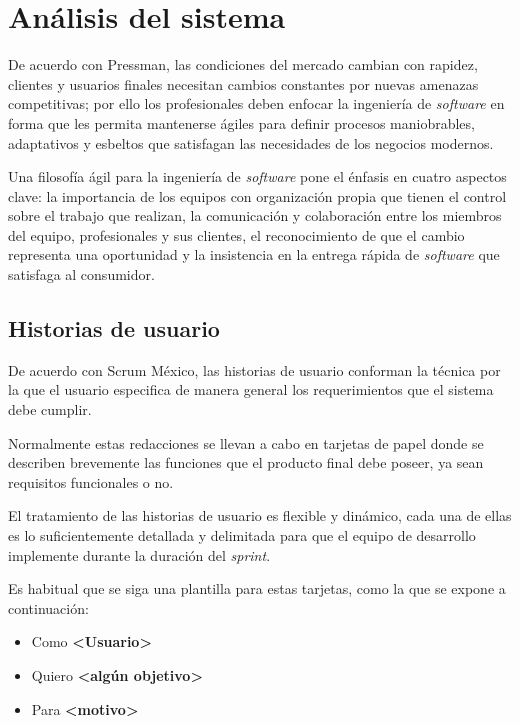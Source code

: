 \section{Análisis del sistema}
De acuerdo con Pressman\cite{pressman_software_2005}, las condiciones del mercado cambian con rapidez, clientes y usuarios finales necesitan cambios constantes por nuevas amenazas competitivas; por ello los profesionales deben enfocar la ingeniería de \textit{software} en forma que les permita mantenerse ágiles para definir procesos maniobrables, adaptativos y esbeltos que satisfagan las necesidades de los negocios modernos.


Una filosofía ágil para la ingeniería de \textit{software} pone el énfasis en cuatro aspectos clave: la importancia de los equipos con organización propia que tienen el control sobre el trabajo que realizan, la comunicación y colaboración entre los miembros del equipo, profesionales y sus clientes, el reconocimiento de que el cambio representa una oportunidad y la insistencia en la entrega rápida de \textit{software} que satisfaga al consumidor.


\subsection{Historias de usuario}\label{sec:historias-usuario}

De acuerdo con Scrum México\cite{scrum_mexico_scrum_2020}, las historias de usuario conforman la técnica por la que el usuario especifica de manera general los requerimientos que el sistema debe cumplir.


Normalmente estas redacciones se llevan a cabo en tarjetas de papel donde se describen brevemente las funciones que el producto final debe poseer, ya sean requisitos funcionales o no.


El tratamiento de las historias de usuario es flexible y dinámico, cada una de ellas es lo suficientemente detallada y delimitada para que el equipo de desarrollo implemente durante la duración del \textit{sprint}.


Es habitual que se siga una plantilla para estas tarjetas, como la que se expone a continuación:

\begin{itemize}
	\item Como \textbf{<Usuario>}
	\item Quiero \textbf{<algún objetivo>}
	\item Para \textbf{<motivo>}
\end{itemize}


